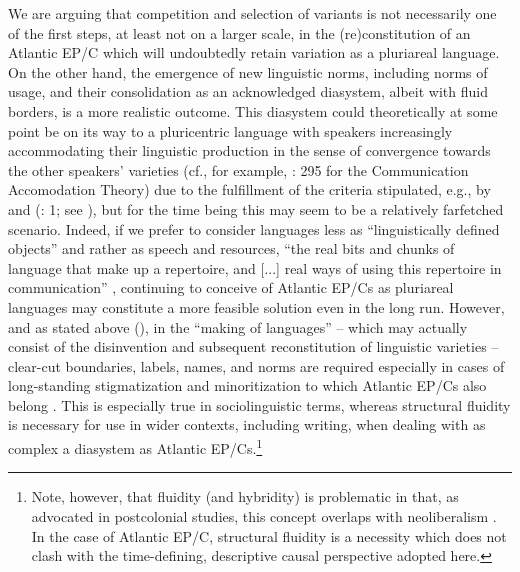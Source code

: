 \documentclass[output=paper,colorlinks,citecolor=brown]{langscibook}
\begin{document}
We are arguing that competition and selection of variants is not necessarily one of the first steps, at least not on a larger scale, in the (re)constitution of an Atlantic EP/C which will undoubtedly retain variation as a pluriareal language. On the other hand, the emergence of new linguistic norms, including norms of usage, and their consolidation as an acknowledged diasystem, albeit with fluid borders, is a more realistic outcome. This diasystem could theoretically at some point be on its way to a pluricentric language with speakers increasingly accommodating their linguistic production in the sense of convergence towards the other speakers’ varieties (cf., for example, \cite{Giles_Ogay_2007}: 295 for the Communication Accomodation Theory) due to the fulfillment of the criteria stipulated, e.g., by \citet[20]{Muhr_2012} and \citeauthor{Clyne_1992} (\citeyear{Clyne_1992}: 1; see ), but for the time being this may seem to be a relatively farfetched scenario. Indeed, if we prefer to consider languages less as “linguistically defined objects” and rather as speech and resources, “the real bits and chunks of language that make up a repertoire, and [...] real ways of using this repertoire in communication” \citep[5, 173]{Blommaert_2010}, continuing to conceive of Atlantic EP/Cs as pluriareal languages may constitute a more feasible solution even in the long run. However, and as stated above (), in the “making of languages” – which may actually consist of the disinvention and subsequent reconstitution of linguistic varieties \citep{Makoni_2005} – clear-cut boundaries, labels, names, and norms are required especially in cases of long-standing stigmatization and minoritization to which Atlantic EP/Cs also belong \citep[cf.][]{Huning_Kramer_2018}. This is especially true in sociolinguistic terms, whereas structural fluidity is necessary for use in wider contexts, including writing, when dealing with as complex a diasystem as Atlantic EP/Cs.\footnote{Note, however, that fluidity (and hybridity) is problematic in that, as advocated in postcolonial studies, this concept overlaps with neoliberalism \citep{Kubota2016}. In the case of Atlantic EP/C, structural fluidity is a necessity which does not clash with the time-defining, descriptive causal perspective adopted here.}
\end{document}
